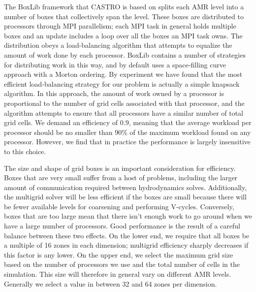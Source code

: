 \documentclass[iop]{emulateapj}
\begin{document}
The BoxLib framework that CASTRO is based on splits each AMR level into a number 
of boxes that collectively span the level. These boxes are distributed to processors 
through MPI parallelism; each MPI task in general holds multiple boxes and 
an update includes a loop over all the boxes an MPI task owns. The distribution 
obeys a load-balancing algorithm that attempts to equalize the amount of work 
done by each processor. BoxLib contains a number of strategies for distributing 
work in this way, and by default uses a space-filling curve approach with a 
Morton ordering. By experiment we have found that the most efficient load-balancing 
strategy for our problem is actually a simple knapsack algorithm. In this approach, 
the amount of work owned by a processor is proportional to the number of grid cells 
associated with that processor, and the algorithm attempts to ensure that all 
processors have a similar number of total grid cells. We demand an efficiency of 0.9,
meaning that the average workload per processor should be no smaller than 90\% of the 
maximum workload found on any processor. However, we find that in practice the 
performance is largely insensitive to this choice.

The size and shape of grid boxes is an important consideration for efficiency. 
Boxes that are very small suffer from a host of problems, including the larger 
amount of communication required between hydrodynamics solves. Additionally, 
the multigrid solver will be less efficient if the boxes are small because there 
will be fewer available levels for coarsening and performing V-cycles. Conversely, 
boxes that are too large mean that there isn't enough work to go around when we 
have a large number of processors. Good performance is the result of a careful 
balance between these two effects. On the lower end, we require that all boxes 
be a multiple of 16 zones in each dimension; multigrid efficiency sharply decreases 
if this factor is any lower. On the upper end, we select the maximum grid size 
based on the number of processors we use and the total number of cells in the 
simulation. This size will therefore in general vary on different AMR levels. 
Generally we select a value in between 32 and 64 zones per dimension.
\end{document}
